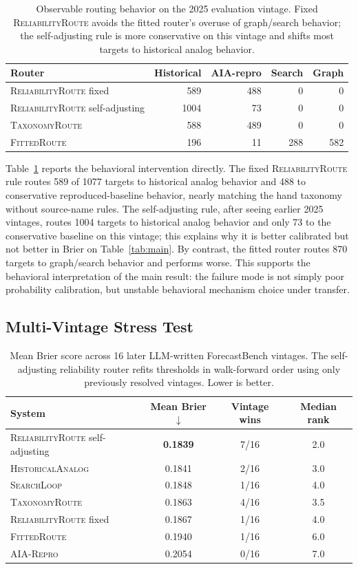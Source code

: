 \documentclass{article}
\newcommand{\tax}{\textsc{TaxonomyRoute}}
\newcommand{\rel}{\textsc{ReliabilityRoute}}
\newcommand{\fitroute}{\textsc{FittedRoute}}
\newcommand{\hist}{\textsc{HistoricalAnalog}}
\newcommand{\search}{\textsc{SearchLoop}}
\newcommand{\aialocal}{\textsc{AIA-Repro}}
\begin{document}
\begin{table}[t]
\centering
\caption{Observable routing behavior on the 2025 evaluation vintage. Fixed \rel{} avoids the fitted router's overuse of graph/search behavior; the self-adjusting rule is more conservative on this vintage and shifts most targets to historical analog behavior.}
\label{tab:behavior}
\begin{tabular}{lrrrr}
\toprule
Router & Historical & AIA-repro & Search & Graph \\
\midrule
\rel{} fixed & 589 & 488 & 0 & 0 \\
\rel{} self-adjusting & 1004 & 73 & 0 & 0 \\
\tax{} & 588 & 489 & 0 & 0 \\
\fitroute{} & 196 & 11 & 288 & 582 \\
\bottomrule
\end{tabular}
\end{table}

Table~\ref{tab:behavior} reports the behavioral intervention directly. The fixed \rel{} rule routes 589 of 1077 targets to historical analog behavior and 488 to conservative reproduced-baseline behavior, nearly matching the hand taxonomy without source-name rules. The self-adjusting rule, after seeing earlier 2025 vintages, routes 1004 targets to historical analog behavior and only 73 to the conservative baseline on this vintage; this explains why it is better calibrated but not better in Brier on Table~\ref{tab:main}. By contrast, the fitted router routes 870 targets to graph/search behavior and performs worse. This supports the behavioral interpretation of the main result: the failure mode is not simply poor probability calibration, but unstable behavioral mechanism choice under transfer.

\subsection{Multi-Vintage Stress Test}

\begin{table}[t]
\centering
\caption{Mean Brier score across 16 later LLM-written ForecastBench vintages. The self-adjusting reliability router refits thresholds in walk-forward order using only previously resolved vintages. Lower is better.}
\label{tab:multivintage}
\begin{tabular}{lccc}
\toprule
System & Mean Brier $\downarrow$ & Vintage wins & Median rank \\
\midrule
\rel{} self-adjusting & \textbf{0.1839} & 7/16 & 2.0 \\
\hist{} & 0.1841 & 2/16 & 3.0 \\
\search{} & 0.1848 & 1/16 & 4.0 \\
\tax{} & 0.1863 & 4/16 & 3.5 \\
\rel{} fixed & 0.1867 & 1/16 & 4.0 \\
\fitroute{} & 0.1940 & 1/16 & 6.0 \\
\aialocal{} & 0.2054 & 0/16 & 7.0 \\
\bottomrule
\end{tabular}
\end{table}
\end{document}
